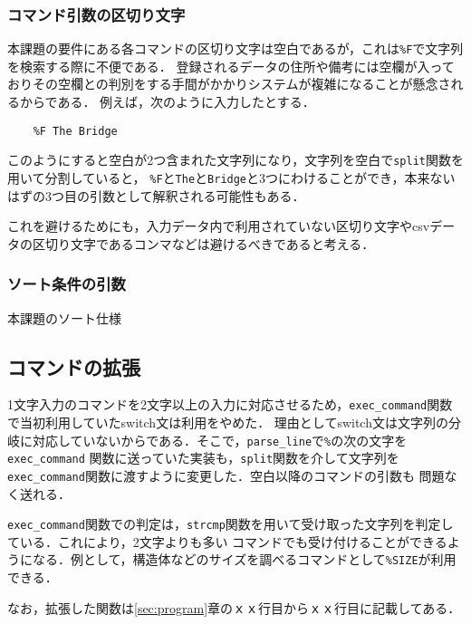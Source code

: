 \documentclass[a4j,11pt]{jarticle}
\begin{document}
\subsubsection{コマンド引数の区切り文字}
本課題の要件にある各コマンドの区切り文字は空白であるが，これは\verb|%F|で文字列を検索する際に不便である．
登録されるデータの住所や備考には空欄が入っておりその空欄との判別をする手間がかかりシステムが複雑になることが懸念されるからである．
例えば，次のように入力したとする．
\begin{verbatim}
    %F The Bridge
\end{verbatim}

このようにすると空白が2つ含まれた文字列になり，文字列を空白で\verb|split|関数を用いて分割していると，
\verb|%F|と\verb|The|と\verb|Bridge|と3つにわけることができ，本来ないはずの3つ目の引数として解釈される可能性もある．


これを避けるためにも，入力データ内で利用されていない区切り文字やcsvデータの区切り文字であるコンマなどは避けるべきであると考える．
\subsubsection{ソート条件の引数}
本課題のソート仕様
\subsection{コマンドの拡張}
1文字入力のコマンドを2文字以上の入力に対応させるため，\verb|exec_command|関数で当初利用していたswitch文は利用をやめた．
理由としてswitch文は文字列の分岐に対応していないからである．そこで，\verb|parse_line|で\verb|%|の次の文字を\verb|exec_command|
関数に送っていた実装も，\verb|split|関数を介して文字列を\verb|exec_command|関数に渡すように変更した．空白以降のコマンドの引数も
問題なく送れる．

\verb|exec_command|関数での判定は，\verb|strcmp|関数を用いて受け取った文字列を判定している．これにより，2文字よりも多い
コマンドでも受け付けることができるようになる．例として，構造体などのサイズを調べるコマンドとして\verb|%SIZE|が利用できる．

なお，拡張した関数は\ref{sec:program}章のｘｘ行目からｘｘ行目に記載してある．
\end{document}
